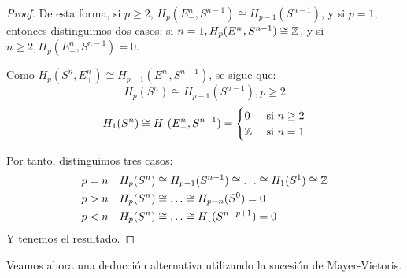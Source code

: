 \begin{proof}
  De esta forma, si $p \geq 2$, $H_p(E_-^n, S^{n-1}) \cong H_{p-1}(S^{n-1})$, y si $p = 1$, entonces distinguimos
  dos casos: si $n = 1, H_p(E_-^n, S^{n-1}) \cong \mathbb{Z}$, y si $n \geq 2, H_p(E_-^n, S^{n-1}) = 0$.

  Como $H_p(S^n, E_+^n) \cong H_{p-1}(E_-^n, S^{n-1})$, se sigue que:
  \[ H_p(S^n) \cong H_{p-1}(S^{n-1}), p \geq 2 \]
  \[ H_1(S^n) \cong H_1(E_-^n, S^{n-1}) = \begin{cases} 0 &\text{ si } n \geq 2 \\ \mathbb{Z} &\text{ si } n = 1 \end{cases} \]

  Por tanto, distinguimos tres casos:
  \begin{align*}
      p = n &\quad H_p(S^n) \cong H_{p-1}(S^{n-1}) \cong \dots \cong H_1(S^1) \cong \mathbb{Z} \\
      p > n &\quad H_p(S^n) \cong \dots \cong H_{p-n}(S^0) = 0 \\
      p < n &\quad H_p(S^n) \cong \dots \cong H_1(S^{n-p+1}) = 0
  \end{align*}
  Y tenemos el resultado.
\end{proof}

Veamos ahora una deducción alternativa utilizando la sucesión de Mayer-Vietoris.

